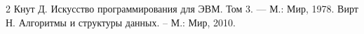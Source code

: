 \documentclass[a4paper,12pt,titlepage,final]{article}
\begin{document}
\newpage
\begin{raggedright}
\begin{thebibliography}{2}
 Кнут Д. Искусство программирования для ЭВМ. Том 3. — М.: Мир, 1978.
 Вирт Н. Алгоритмы и структуры данных. -- М.: Мир, 2010.
\end{thebibliography}
\end{raggedright}
\end{document}
